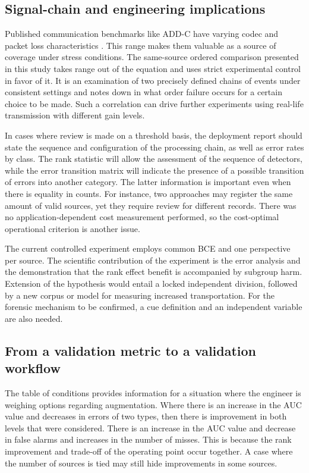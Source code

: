 \subsection{Signal-chain and engineering implications}

Published communication benchmarks like ADD-C have varying codec and packet loss characteristics \cite{addc}. This range makes them valuable as a source of coverage under stress conditions. The same-source ordered comparison presented in this study takes range out of the equation and uses strict experimental control in favor of it. It is an examination of two precisely defined chains of events under consistent settings and notes down in what order failure occurs for a certain choice to be made. Such a correlation can drive further experiments using real-life transmission with different gain levels.

In cases where review is made on a threshold basis, the deployment report should state the sequence and configuration of the processing chain, as well as error rates by class. The rank statistic will allow the assessment of the sequence of detectors, while the error transition matrix will indicate the presence of a possible transition of errors into another category. The latter information is important even when there is equality in counts. For instance, two approaches may register the same amount of valid sources, yet they require review for different records. There was no application-dependent cost measurement performed, so the cost-optimal operational criterion is another issue.

The current controlled experiment employs common BCE and one perspective per source. The scientific contribution of the experiment is the error analysis and the demonstration that the rank effect benefit is accompanied by subgroup harm. Extension of the hypothesis would entail a locked independent division, followed by a new corpus or model for measuring increased transportation. For the forensic mechanism to be confirmed, a cue definition and an independent variable are also needed.

\subsection{From a validation metric to a validation workflow}

The table of conditions provides information for a situation where the engineer is weighing options regarding augmentation. Where there is an increase in the AUC value and decreases in errors of two types, then there is improvement in both levels that were considered. There is an increase in the AUC value and decrease in false alarms and increases in the number of misses. This is because the rank improvement and trade-off of the operating point occur together. A case where the number of sources is tied may still hide improvements in some sources.


